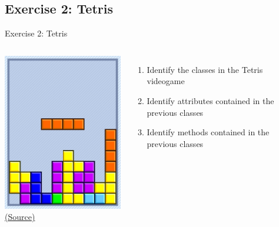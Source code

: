 \documentclass[10pt,compress]{beamer} %
\begin{document}
\subsection{Exercise 2: Tetris}
	\begin{frame}{Exercise 2: Tetris}
    \begin{columns}
		\centering \includegraphics[width=\linewidth]{figs/tetris.png}\\
		\tiny{\href{http://gamedevelopment.tutsplus.com/tutorials/quick-tip-intro-to-object-oriented-programming-for-game-development--gamedev-1805}{(Source)}}
	\begin{enumerate}
	\item Identify the classes in the Tetris videogame
	\item Identify attributes contained in the previous classes
	\item Identify methods contained in the previous classes
	\end{enumerate}
	\end{columns}
\end{frame}
\end{document}
